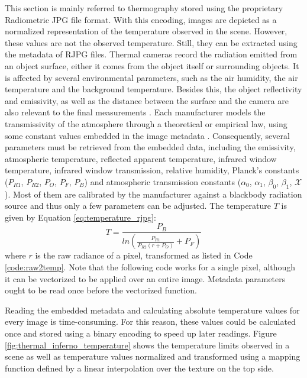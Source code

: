 This section is mainly referred to thermography stored using the proprietary Radiometric JPG file format. With this encoding, images are depicted as a normalized representation of the temperature observed in the scene. However, these values are not the observed temperature. Still, they can be extracted using the metadata of RJPG files. Thermal cameras record the radiation emitted from an object surface, either it comes from the object itself or surrounding objects. It is affected by several environmental parameters, such as the air humidity, the air temperature and the background temperature. Besides this, the object reflectivity and emissivity, as well as the distance between the surface and the camera are also relevant to the final measurements \cite{vollmer_infrared_2017}. Each manufacturer models the transmissivity of the atmosphere through a theoretical or empirical law, using some constant values embedded in the image metadata \cite{teza_evaluation_2019}. Consequently, several parameters must be retrieved from the embedded data, including the emissivity, atmospheric temperature, reflected apparent temperature, infrared window temperature, infrared window transmission, relative humidity, Planck's constants ($P_{R1}$, $P_{R2}$, $P_O$, $P_F$, $P_B$) and atmospheric transmission constants ($\alpha_0$, $\alpha_1$, $\beta_0$, $\beta_1$, $\mathcal{X}$). Most of them are calibrated by the manufacturer against a blackbody radiation source and thus only a few parameters can be adjusted. The temperature $T$ is given by Equation \ref{eq:temperature_rjpg}:
\begin{equation}
    \label{eq:temperature_rjpg}
    T = \frac{P_B}{ln\left(\frac{P_{R1}}{P_{R2} (\textit{r} + P_O)} + P_F\right)}
\end{equation}
where $\textit{r}$ is the raw radiance of a pixel, transformed as listed in Code \ref{code:raw2temp}. Note that the following code works for a single pixel, although it can be vectorized to be applied over an entire image. Metadata parameters ought to be read once before the vectorized function.



Reading the embedded metadata and calculating absolute temperature values for every image is time-consuming. For this reason, these values could be calculated once and stored using a binary encoding to speed up later readings. Figure \ref{fig:thermal_inferno_temperature} shows the temperature limits observed in a scene as well as temperature values normalized and transformed using a mapping function defined by a linear interpolation over the texture on the top side.


